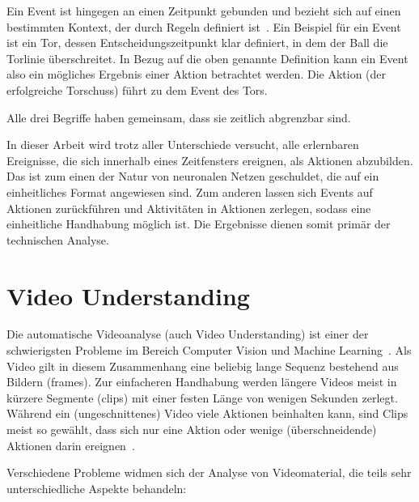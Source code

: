 Ein Event ist hingegen an einen Zeitpunkt gebunden und bezieht sich auf einen bestimmten Kontext, der durch Regeln definiert ist~\cite{Giancola18}.
Ein Beispiel für ein Event ist \ua ein Tor, dessen Entscheidungszeitpunkt klar definiert, in dem der Ball die Torlinie überschreitet.
In Bezug auf die oben genannte Definition kann ein Event also ein mögliches Ergebnis einer Aktion betrachtet werden.
Die Aktion (der erfolgreiche Torschuss) führt zu dem Event des Tors.

Alle drei Begriffe haben gemeinsam, dass sie zeitlich abgrenzbar sind.

In dieser Arbeit wird trotz aller Unterschiede versucht, alle erlernbaren Ereignisse, die sich innerhalb eines Zeitfensters ereignen, als Aktionen abzubilden.
Das ist zum einen der Natur von neuronalen Netzen geschuldet, die auf ein einheitliches Format angewiesen sind.
Zum anderen lassen sich Events auf Aktionen zurückführen und Aktivitäten in Aktionen zerlegen, sodass eine einheitliche Handhabung möglich ist.
Die Ergebnisse dienen somit primär der technischen Analyse.


\section{Video Understanding}
\label{sec:video-understanding}

Die automatische Videoanalyse (auch Video Understanding) ist einer der schwierigsten Probleme im Bereich Computer Vision und Machine Learning~\cite{Sozykin17,Jiang19}.
Als Video gilt in diesem Zusammenhang eine beliebig lange Sequenz bestehend aus Bildern (\gls{frames}).
Zur einfacheren Handhabung werden längere Videos meist in kürzere Segmente (\gls{clips}) mit einer festen Länge von wenigen Sekunden zerlegt.
Während ein (ungeschnittenes) Video viele Aktionen beinhalten kann, sind Clips meist so gewählt, dass sich nur eine Aktion oder wenige (überschneidende) Aktionen darin ereignen~\cite{Jiang19,Kay17}.

Verschiedene Probleme widmen sich der Analyse von Videomaterial, die teils sehr unterschiedliche Aspekte behandeln:

